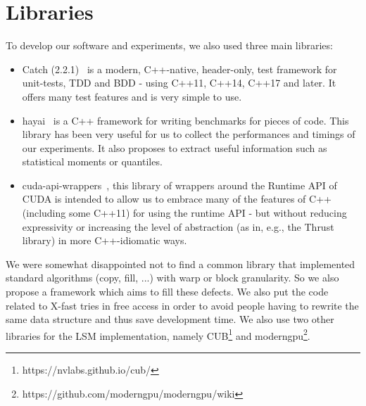 
\section{Libraries}

To develop our software and experiments, we also used three main libraries:

\begin{itemize}
    \item Catch (2.2.1)~\cite{CATCH} is a modern, C++-native, header-only, test framework for unit-tests, TDD and BDD - using C++11, C++14, C++17 and later. It offers many test features and is very simple to use.
    \item hayai~\cite{HAYAI} is a C++ framework for writing benchmarks for pieces of code. This library has been very useful for us to collect the performances and timings of our experiments. It also proposes to extract useful information such as statistical moments or quantiles.
    \item cuda-api-wrappers~\cite{CUDAWRAPPER}, this library of wrappers around the Runtime API of CUDA is intended to allow us to embrace many of the features of C++ (including some C++11) for using the runtime API - but without reducing expressivity or increasing the level of abstraction (as in, e.g., the Thrust library) in more C++-idiomatic ways.
\end{itemize}

We were somewhat disappointed not to find a common library that implemented standard algorithms (copy, fill, ...) with warp or block granularity. So we also propose a framework which aims to fill these defects. We also put the code related to X-fast tries in free access in order to avoid people having to rewrite the same data structure and thus save development time. We also use two other libraries for the LSM implementation, namely CUB\footnote{https://nvlabs.github.io/cub/} and moderngpu\footnote{https://github.com/moderngpu/moderngpu/wiki}.
